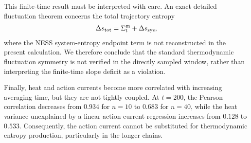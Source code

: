 This finite-time result must be interpreted with care.  An exact detailed
fluctuation theorem concerns the total trajectory entropy
\begin{equation}
  \Delta s_{\rm tot}=\Sigma_t^{\mathrm m}+\Delta s_{\rm sys},
\end{equation}
where the NESS system-entropy endpoint term is not reconstructed in the
present calculation.  We therefore conclude that the standard thermodynamic
fluctuation symmetry is not verified in the directly sampled window, rather
than interpreting the finite-time slope deficit as a violation.

Finally, heat and action currents become more correlated with increasing
averaging time, but they are not tightly coupled.  At $t=200$, the Pearson
correlation decreases from $0.934$ for $n=10$ to $0.683$ for $n=40$, while the
heat variance unexplained by a linear action-current regression increases from
$0.128$ to $0.533$.  Consequently, the action current cannot be substituted
for thermodynamic entropy production, particularly in the longer chains.
